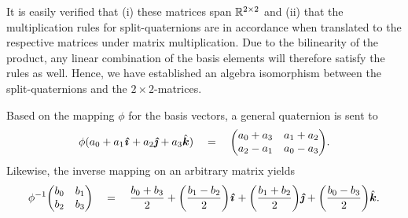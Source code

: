 It is easily verified that (i) these matrices span \(\mathbb{R}^{2\times2}\) and (ii) that the multiplication rules for split-quaternions are in accordance when translated to the respective matrices under matrix multiplication. Due to the bilinearity of the product, any linear combination of the basis elements will therefore satisfy the rules as well. Hence, we have established an algebra isomorphism between the split-quaternions and the \(2\times 2\)-matrices. 

Based on the mapping \(\phi\) for the basis vectors, a general quaternion is sent to 
\begin{equation}
    \phi(\quat{a_0}{a_1}{a_2}{a_3}) \quad = \quad \mqty(a_0 + a_3 & a_1 + a_2 \\ a_2 - a_1 & a_0 - a_3). 
    \label{eq:quat_isom}
\end{equation}
Likewise, the inverse mapping on an arbitrary matrix yields
\begin{equation}
    \phi^{-1}\mqty(b_0 & b_1 \\ b_2 & b_3) \quad = \quad \quat{\frac{b_0 + b_3}{2}}{\qty(\frac{b_1 - b_2}{2})}{\qty(\frac{b_1 + b_2}{2})}{\qty(\frac{b_0 - b_3}{2})}. 
    \label{eq:inv_quat_isom}
\end{equation}

